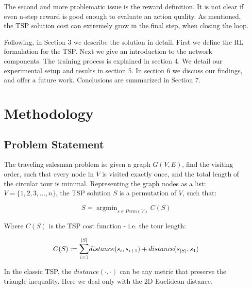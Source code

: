 \documentclass[10pt,a4paper,draft]{article}
\DeclareMathOperator*{\argmin}{argmin}
\begin{document}
The second and more problematic issue is the reward definition. It is not clear if even n-step reward is good enough to evaluate an action quality. As mentioned, the TSP solution cost can extremely grow in the final step, when closing the loop.

Following, in Section 3 we describe the solution in detail. First we define the RL formulation for the TSP. Next we give an introduction to the network components. The training process is explained in section 4. We detail our experimental setup and results in section 5. In section 6 we discuss our findings, and offer a future work. Conclusions are summarized in Section 7.

\section{Methodology}
\subsection{Problem Statement}
The traveling salesman problem is: given a graph $G(V,E)$, find the visiting order, such that every node in $V$ is visited exactly once, and the total length of the circular tour is minimal. Representing the graph nodes as a list: $V = \{1,2,3,...,n\}$, the TSP solution $S$ is a permutation of $V$, such that:

\begin{equation} \label{tsp_statement}
	S = \argmin_{s \in Perm(V)} C(S)
\end{equation}

Where $C(S)$ is the TSP cost function - i.e. the tour length:

\begin{equation}  \label{tsp_cost}
	C(S) := \mathlarger{\sum}_{i=1}^{|S|}{distance(s_i, s_{i+1})} + distance(s_{|S|}, s_1)
\end{equation}

In the classic TSP, the $distance(\cdot,\cdot)$ can be any metric that preserve the triangle inequality. Here we deal only with the 2D Euclidean distance. 
\end{document}
